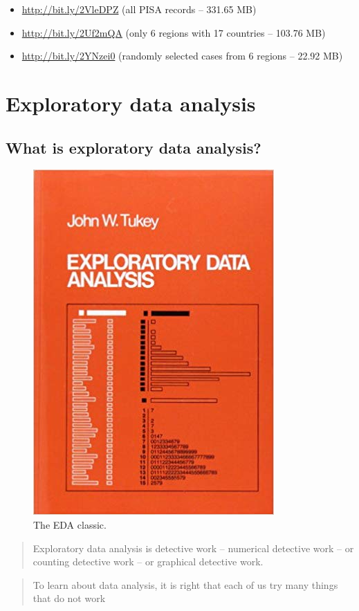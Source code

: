 \documentclass[]{book}
\providecommand{\tightlist}{%
  \setlength{\itemsep}{0pt}\setlength{\parskip}{0pt}}
\begin{document}
\begin{itemize}
\tightlist
\item
  \url{http://bit.ly/2VleDPZ} (all PISA records -- 331.65 MB)
\item
  \url{http://bit.ly/2Uf2mQA} (only 6 regions with 17 countries -- 103.76 MB)
\item
  \url{http://bit.ly/2YNzei0} (randomly selected cases from 6 regions -- 22.92 MB)
\end{itemize}

\hypertarget{eda}{%
\chapter{Exploratory data analysis}\label{eda}}

\hypertarget{what-is-exploratory-data-analysis}{%
\section{What is exploratory data analysis?}\label{what-is-exploratory-data-analysis}}

\begin{figure}
\includegraphics[width=0.4\linewidth]{images/tukey} \caption{The EDA classic.}\label{fig:tukey}
\end{figure}

\begin{quote}
Exploratory data analysis is detective work -- numerical detective work -- or counting detective work -- or graphical detective work.
\end{quote}

\begin{quote}
To learn about data analysis, it is right that each of us try many things that do not work
\end{quote}
\end{document}
